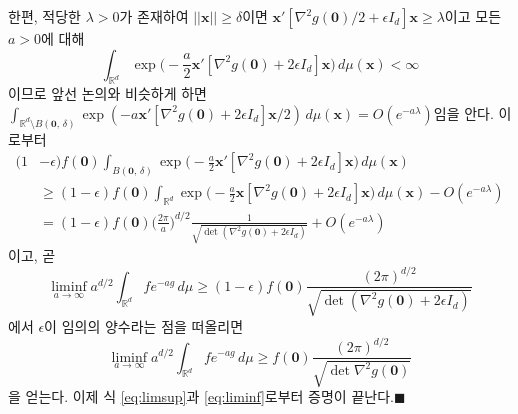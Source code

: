 \documentclass[10pt,onecolumn,twoside,a4size]{gsag3jnl}
\begin{document}
한편, 적당한 $\lambda>0$가 존재하여 $||\mathbf{x}||\geq\delta$이면 $\mathbf{x}'[\nabla^2g(\mathbf{0})/2+\epsilon I_d]\mathbf{x}\geq\lambda$이고 모든 $a>0$에 대해 
\begin{equation}
  \int_{\mathbb{R}^d}\exp\bigg(-\frac{a}{2}\mathbf{x}'[\nabla^2g(\mathbf{0})+2\epsilon I_d]\mathbf{x}\bigg)\,d\mu(\mathbf{x})<\infty
\end{equation}
이므로 앞선 논의와 비슷하게 하면 $\int_{\mathbb{R}^d\setminus B(\mathbf{0},\,\delta)}\exp(-a\mathbf{x}'[\nabla^2g(\mathbf{0})+2\epsilon I_d]\mathbf{x}/2)\,d\mu(\mathbf{x})=O(e^{-a\lambda})$임을 안다. 이로부터
\begin{align}
  (1&-\epsilon)f(\mathbf{0})\int_{B(\mathbf{0},\,\delta)}\exp\bigg(-\frac{a}{2}\mathbf{x}'[\nabla^2g(\mathbf{0})+2\epsilon I_d]\mathbf{x}\bigg)\,d\mu(\mathbf{x})\\
  &\geq(1-\epsilon)f(\mathbf{0})\int_{\mathbb{R}^d}\exp\bigg(-\frac{a}{2}\mathbf{x}[\nabla^2g(\mathbf{0})+2\epsilon I_d]\mathbf{x}\bigg)\,d\mu(\mathbf{x})-O(e^{-a\lambda})\nonumber\\
  &=(1-\epsilon)f(\mathbf{0})\bigg(\frac{2\pi}{a}\bigg)^{d/2}\frac{1}{\sqrt{\det(\nabla^2 g(\mathbf{0})+2\epsilon I_d)}}+O(e^{-a\lambda})\nonumber
\end{align}
이고, 곧 
\begin{equation}
  \liminf_{a\to\infty}a^{d/2}\int_{\mathbb{R}^d}fe^{-ag}\,d\mu\geq(1-\epsilon)f(\mathbf{0})\frac{(2\pi)^{d/2}}{\sqrt{\det(\nabla^2 g(\mathbf{0})+2\epsilon I_d)}}
\end{equation}
에서 $\epsilon$이 임의의 양수라는 점을 떠올리면
\begin{equation}\label{eq:liminf}
  \liminf_{a\to\infty}a^{d/2}\int_{\mathbb{R}^d}fe^{-ag}\,d\mu\geq f(\mathbf{0})\frac{(2\pi)^{d/2}}{\sqrt{\det\nabla^2 g(\mathbf{0})}}
\end{equation}
을 얻는다. 이제 식 \ref{eq:limsup}과 \ref{eq:liminf}로부터 증명이 끝난다.\hfill$\blacksquare$\\
\end{document}
